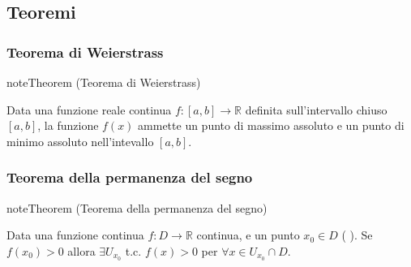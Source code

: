 \documentclass[letterpaper,10pt,italian]{jupyterBook}
\begin{document}
\sphinxAtStartPar
{} 


\subsection{Teoremi}
\label{\detokenize{ch/infinitesimal_calculus/analysis:teoremi}}\label{\detokenize{ch/infinitesimal_calculus/analysis:infinitesimal-calculus-continuous-fun-thms}}

\subsubsection{Teorema di Weierstrass}
\label{\detokenize{ch/infinitesimal_calculus/analysis:teorema-di-weierstrass}}\label{\detokenize{ch/infinitesimal_calculus/analysis:infinitesimal-calculus-continuous-fun-thms-weierstrass}}\label{None:thm:infinitesimal-calculus:continuous-fun:thms:weierstrass}
\begin{sphinxadmonition}{note}{Theorem  (Teorema di Weierstrass)}



\sphinxAtStartPar
Data una funzione reale continua \(f: [a,b] \rightarrow \mathbb{R}\) definita sull’intervallo chiuso \([a,b]\), la funzione \(f(x)\) ammette un punto di massimo assoluto e un punto di minimo assoluto nell’intevallo \([a,b]\).
\end{sphinxadmonition}

\sphinxAtStartPar
{} 


\subsubsection{Teorema della permanenza del segno}
\label{\detokenize{ch/infinitesimal_calculus/analysis:teorema-della-permanenza-del-segno}}\label{\detokenize{ch/infinitesimal_calculus/analysis:infinitesimal-calculus-continuous-fun-thms-sign}}\label{None:thm:infinitesimal-calculus:continuous-fun:thms:sign}
\begin{sphinxadmonition}{note}{Theorem  (Teorema della permanenza del segno)}



\sphinxAtStartPar
Data una funzione continua \(f: D \rightarrow \mathbb{R}\) continua, e un punto \(x_0 \in D\) ( ). Se \(f(x_0) > 0\) allora \(\exists U_{x_0}\) t.c. \(f(x) > 0\) per \(\forall x \in U_{x_0} \cap D\).
\end{sphinxadmonition}
\end{document}
